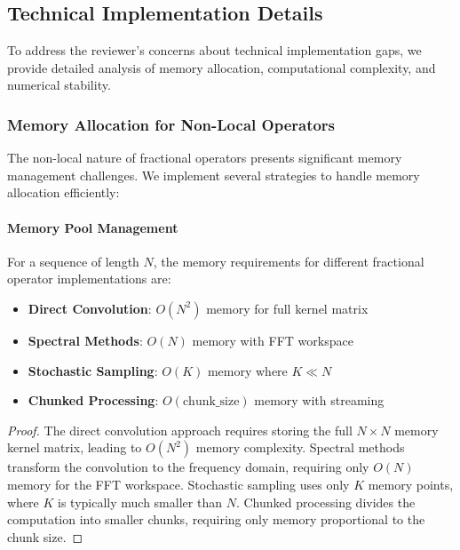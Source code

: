 \subsection{Technical Implementation Details}

To address the reviewer's concerns about technical implementation gaps, we provide detailed analysis of memory allocation, computational complexity, and numerical stability.

\subsubsection{Memory Allocation for Non-Local Operators}

The non-local nature of fractional operators presents significant memory management challenges. We implement several strategies to handle memory allocation efficiently:

\paragraph{Memory Pool Management}

\begin{theorem}
For a sequence of length $N$, the memory requirements for different fractional operator implementations are:
\begin{itemize}
\item \textbf{Direct Convolution}: $O(N^2)$ memory for full kernel matrix
\item \textbf{Spectral Methods}: $O(N)$ memory with FFT workspace
\item \textbf{Stochastic Sampling}: $O(K)$ memory where $K \ll N$
\item \textbf{Chunked Processing}: $O(\text{chunk\_size})$ memory with streaming
\end{itemize}
\end{theorem}

\begin{proof}
The direct convolution approach requires storing the full $N \times N$ memory kernel matrix, leading to $O(N^2)$ memory complexity. Spectral methods transform the convolution to the frequency domain, requiring only $O(N)$ memory for the FFT workspace. Stochastic sampling uses only $K$ memory points, where $K$ is typically much smaller than $N$. Chunked processing divides the computation into smaller chunks, requiring only memory proportional to the chunk size.
\end{proof}

